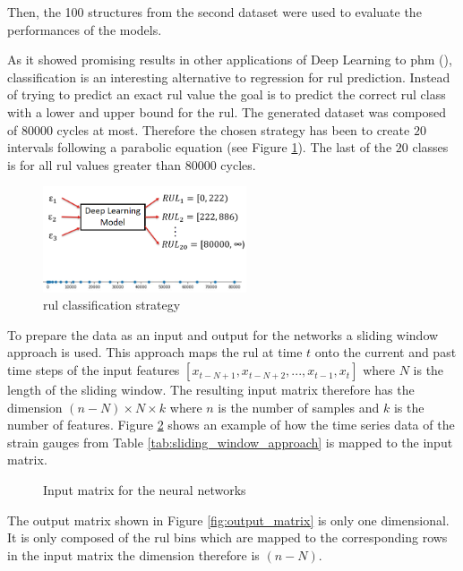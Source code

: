 \documentclass[conference]{IEEEtran}
\begin{document}
Then, the 100 structures from the second dataset were used to evaluate the performances of the models.


As it showed promising results in other applications of Deep Learning to \gls{phm} (\cite{Liu2019a, Xiao2016}), classification is an interesting alternative to regression for \gls{rul} prediction. Instead of trying to predict an exact \gls{rul} value the goal is to predict the correct \gls{rul} class with a lower and upper bound for the \gls{rul}. The generated dataset was composed of $ 80 000 $ cycles at most. Therefore the chosen strategy has been to create $ 20 $ intervals following a parabolic equation (see Figure \ref{fig:RUL_classification}). The last of the $ 20 $ classes is for all \gls{rul} values greater than $ 80 000 $ cycles.

\begin{figure}[htp]
	\centering
	\includegraphics[width=6cm]{RUL_Classification.png}
	\caption{\gls{rul} classification strategy}
	\label{fig:RUL_classification}
\end{figure}

To prepare the data as an input and output for the networks a sliding window approach is used. This approach maps the \gls{rul} at time $ t $ onto the current and past time steps of the input features $ [x_{t-N+1}, x_{t-N+2},..., x_{t-1}, x_t] $ where $ N $ is the length of the sliding window. The resulting input matrix therefore has the dimension $ (n-N) \times N \times k $ where $ n $ is the number of samples and $ k $ is the number of features. Figure \ref{fig:input_matrix} shows an example of how the time series data of the strain gauges from Table \ref{tab:sliding_window_approach} is mapped to the input matrix.

\begin{figure}[htp]
	\centering
	
	\caption{Input matrix for the neural networks}
	\label{fig:input_matrix}
\end{figure}

The output matrix shown in Figure \ref{fig:output_matrix} is only one dimensional. It is only composed of the \gls{rul} bins which are mapped to the corresponding rows in the input matrix the dimension therefore is $ (n-N) $.
\end{document}
